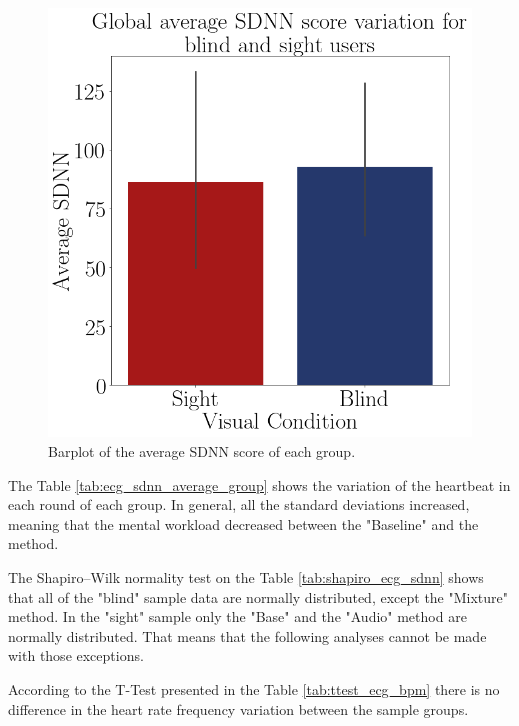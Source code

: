 \begin{figure}[!htb]
\begin{minipage}{.45\linewidth}
        \centering
        \includegraphics[width = \linewidth]{Resultados/ECG/Figuras/png/barplot_ecg_sdnn_global.png}
        \caption{Barplot of the average SDNN score of each group.}
        \label{fig:barplot_ecg_sdnn_global}
    \end{minipage}
\end{figure}


The Table \ref{tab:ecg_sdnn_average_group} shows the variation of the heartbeat in each round of each group. In general, all the standard deviations increased, meaning that the mental workload decreased between the "Baseline" and the method.



The Shapiro–Wilk normality test on the Table \ref{tab:shapiro_ecg_sdnn} shows that all of the "blind" sample data are normally distributed, except the "Mixture" method. In the "sight" sample only the "Base" and the "Audio" method are normally distributed. That means that the following analyses cannot be made with those exceptions.

According to the T-Test presented in the Table \ref{tab:ttest_ecg_bpm} there is no difference in the heart rate frequency variation between the sample groups.

